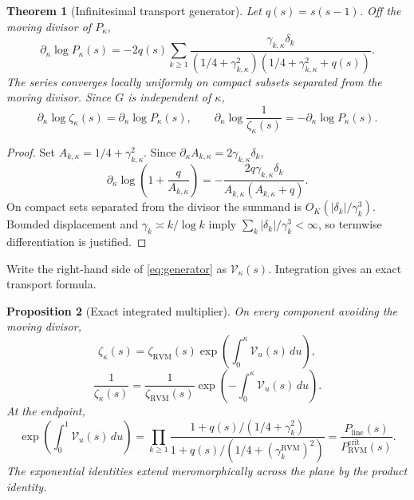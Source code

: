 \documentclass[11pt,reqno]{amsart}
\newtheorem{theorem}{Theorem}[section]
\newtheorem{proposition}[theorem]{Proposition}
\theoremstyle{definition}
\theoremstyle{remark}
\newcommand{\RVM}{\mathrm{RVM}}
\newcommand{\crit}{\mathrm{crit}}
\newcommand{\linez}{\mathrm{line}}
\begin{document}
\begin{theorem}[Infinitesimal transport generator]\label{thm:generator}
Let $q(s)=s(s-1)$.  Off the moving divisor of $P_\kappa$,
\begin{equation}\label{eq:generator}
 \boxed{
 \partial_\kappa\log P_\kappa(s)
 =-2q(s)\sum_{k\ge1}
 \frac{\gamma_{k,\kappa}\delta_k}
 {(1/4+\gamma_{k,\kappa}^2)
  (1/4+\gamma_{k,\kappa}^2+q(s))}.}
\end{equation}
The series converges locally uniformly on compact subsets separated from the moving divisor.  Since $G$ is independent of $\kappa$,
\begin{equation}\label{eq:generator-zeta}
 \partial_\kappa\log\zeta_\kappa(s)
 =\partial_\kappa\log P_\kappa(s),
 \qquad
 \partial_\kappa\log\frac1{\zeta_\kappa(s)}
 =-\partial_\kappa\log P_\kappa(s).
\end{equation}
\end{theorem}

\begin{proof}
Set $A_{k,\kappa}=1/4+\gamma_{k,\kappa}^2$.  Since
$\partial_\kappa A_{k,\kappa}=2\gamma_{k,\kappa}\delta_k$,
\[
 \partial_\kappa
 \log\left(1+\frac{q}{A_{k,\kappa}}\right)
 =-\frac{2q\gamma_{k,\kappa}\delta_k}
 {A_{k,\kappa}(A_{k,\kappa}+q)}.
\]
On compact sets separated from the divisor the summand is
$O_K(|\delta_k|/\gamma_k^3)$.  Bounded displacement and
$\gamma_k\asymp k/\log k$ imply
$\sum_k|\delta_k|/\gamma_k^3<\infty$, so termwise differentiation is justified.
\end{proof}

Write the right-hand side of \eqref{eq:generator} as $\mathcal V_\kappa(s)$.  Integration gives an exact transport formula.

\begin{proposition}[Exact integrated multiplier]\label{prop:integrated-multiplier}
On every component avoiding the moving divisor,
\begin{equation}\label{eq:integrated-zeta}
 \boxed{
 \zeta_\kappa(s)
 =\zeta_{\RVM}(s)
 \exp\left(\int_0^\kappa\mathcal V_u(s)\,du\right),}
\end{equation}
\begin{equation}\label{eq:integrated-inverse}
 \boxed{
 \frac1{\zeta_\kappa(s)}
 =\frac1{\zeta_{\RVM}(s)}
 \exp\left(-\int_0^\kappa\mathcal V_u(s)\,du\right).}
\end{equation}
At the endpoint,
\begin{equation}\label{eq:integrated-product-ratio}
 \exp\left(\int_0^1\mathcal V_u(s)\,du\right)
 =\prod_{k\ge1}
 \frac{1+q(s)/(1/4+\gamma_k^2)}
      {1+q(s)/(1/4+(\gamma_k^{\RVM})^2)}
 =\frac{P_{\linez}(s)}{P_{\RVM}^{\crit}(s)}.
\end{equation}
The exponential identities extend meromorphically across the plane by the product identity.
\end{proposition}
\end{document}

